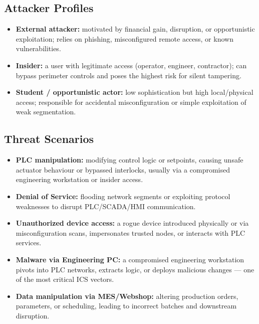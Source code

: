 \documentclass[11pt,a4paper]{article}
\begin{document}
\subsection{Attacker Profiles}
\begin{itemize}[nosep]
  \item \textbf{External attacker:} motivated by financial gain, disruption, or opportunistic exploitation; relies on phishing, misconfigured remote access, or known vulnerabilities.
  \item \textbf{Insider:} a user with legitimate access (operator, engineer, contractor); can bypass perimeter controls and poses the highest risk for silent tampering.
  \item \textbf{Student / opportunistic actor:} low sophistication but high local/physical access; responsible for accidental misconfiguration or simple exploitation of weak segmentation.
\end{itemize}

\subsection{Threat Scenarios}
\begin{itemize}[nosep]
  \item \textbf{PLC manipulation:} modifying control logic or setpoints, causing unsafe actuator behaviour or bypassed interlocks, usually via a compromised engineering workstation or insider access.
  \item \textbf{Denial of Service:} flooding network segments or exploiting protocol weaknesses to disrupt PLC/SCADA/HMI communication.
  \item \textbf{Unauthorized device access:} a rogue device introduced physically or via misconfiguration scans, impersonates trusted nodes, or interacts with PLC services.
  \item \textbf{Malware via Engineering PC:} a compromised engineering workstation pivots into PLC networks, extracts logic, or deploys malicious changes --- one of the most critical ICS vectors.
  \item \textbf{Data manipulation via MES/Webshop:} altering production orders, parameters, or scheduling, leading to incorrect batches and downstream disruption.
\end{itemize}
\end{document}
